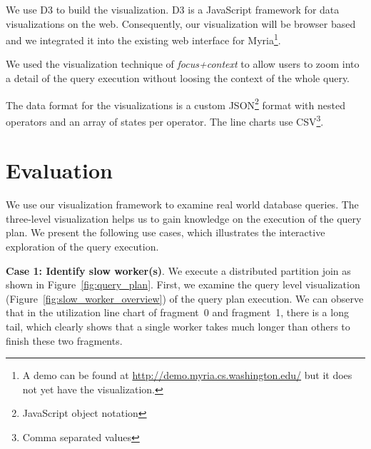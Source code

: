 \documentclass[11pt]{scrartcl}
\begin{document}
We use D3\cite{bostock2011d3} to build the visualization. D3 is a JavaScript framework for data visualizations on the web. Consequently, our visualization will be browser based and we integrated it into the existing web interface for Myria\footnote{A demo can be found at \url{http://demo.myria.cs.washington.edu/} but it does not yet have the visualization.}.

We used the visualization technique of \emph{focus+context}\cite{furnas1986generalized} to allow users to zoom into a detail of the query execution without loosing the context of the whole query.

The data format for the visualizations is a custom JSON\footnote{JavaScript object notation} format with nested operators and an array of states per operator. The line charts use CSV\footnote{Comma separated values}.


\section{Evaluation}
\label{sec:evaluation}
We use our visualization framework to examine real world database queries. The three-level visualization helps us to gain knowledge on the execution of the query plan. We present the following use cases, which illustrates the interactive exploration of the query execution.

\noindent \textbf{Case 1: Identify slow worker(s)}.
We execute a distributed partition join as shown in Figure~\ref{fig:query_plan}. First, we examine the query level visualization (Figure~\ref{fig:slow_worker_overview}) of the query plan execution. We can observe that in the utilization line chart of fragment~0 and fragment~1, there is a long tail, which clearly shows that a single worker takes much longer than others to finish these two fragments.
\end{document}
